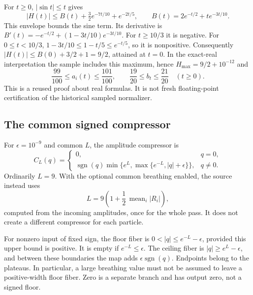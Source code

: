 \documentclass[11pt,a4paper]{article}
\theoremstyle{definition}
\theoremstyle{remark}\newtheorem{remark}[theorem]{Remark}
\DeclareMathOperator{\sgn}{sgn}
\numberwithin{equation}{section}
\begin{document}
For $t\geq0$, $|\sin t|\leq t$ gives
\[
 |H(t)|\leq B(t)+\tfrac32e^{-7t/10}+e^{-2t/5},
 \qquad B(t)=2e^{-t/2}+t e^{-3t/10}.
\]
This envelope bounds the sine term. Its derivative is
$B'(t)=-e^{-t/2}+(1-3t/10)e^{-3t/10}$.
For $t\geq10/3$ it is negative. For $0\leq t<10/3$,
$1-3t/10\leq1-t/5\leq e^{-t/5}$, so it is nonpositive.
Consequently $|H(t)|\leq B(0)+3/2+1=9/2$, attained at $t=0$.
In the exact-real interpretation the sample includes this maximum, hence
$H_{\max}=9/2+10^{-12}$ and
\begin{equation}\label{eq:gainbounds}
 \frac{99}{100}\leq a_i(t)\leq\frac{101}{100},
 \qquad \frac{19}{20}\leq b_t\leq\frac{21}{20}\quad(t\geq0).
\end{equation}
This is a reused proof about real formulas. It is not fresh floating-point
certification of the historical sampled normalizer.

\subsection{The common signed compressor}\label{sec:compression}
For $\epsilon=10^{-9}$ and common $L$, the amplitude compressor is
\begin{equation}\label{eq:compressor}
 C_L(q)=
 \begin{cases}
 0,&q=0,\\
 \sgn(q)\min\{e^L,\max\{e^{-L},|q|+\epsilon\}\},&q\ne0.
 \end{cases}
\end{equation}
Ordinarily $L=9$. With the optional common breathing enabled, the source instead uses
\begin{equation}\label{eq:breathing}
 L=9\left(1+\frac12\,\operatorname{mean}_i|R_i|\right),
\end{equation}
computed from the incoming amplitudes, once for the whole pass.
It does not create a different compressor for each particle.

For nonzero input of fixed sign, the floor fiber is
$0<|q|\leq e^{-L}-\epsilon$, provided this upper bound is positive.
It is empty if $e^{-L}\leq\epsilon$. The ceiling fiber is
$|q|\geq e^L-\epsilon$, and between these boundaries the map adds
$\epsilon\sgn(q)$. Endpoints belong to the plateaus.
In particular, a large breathing value must not be assumed to leave a positive-width
floor fiber. Zero is a separate branch and has output zero, not a signed floor.
\end{document}
